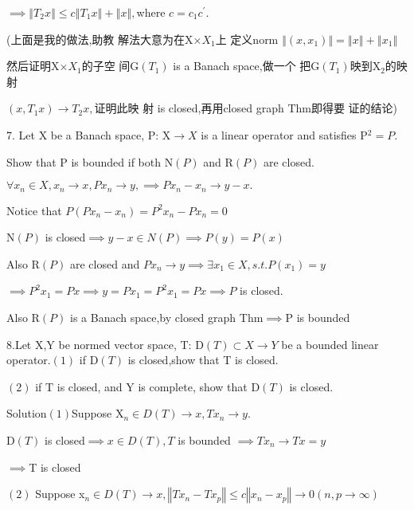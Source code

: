\documentclass{ctexart}
\begin{document}
$\implies \left\Vert T_{2}x\right\Vert \leq c\left\Vert T_{1}x\right\Vert
+\left\Vert x\right\Vert ,$where $c=c_{1}c^{\prime }.$

(上面是我的做法,助教%
解法大意为在X$\times X_{1}$上%
定义norm $\left\Vert \left( x,x_{1}\right) \right\Vert
=\left\Vert x\right\Vert +\left\Vert x_{1}\right\Vert $

然后证明X$\times X_{1}$的子空%
间G$\left( T_{1}\right) $ is a Banach space,做一个%
把G$\left( T_{1}\right) $映到X$_{2}$的映%
射

$\left( x,T_{1}x\right) \rightarrow T_{2}x,$证明此映%
射 is closed,再用closed graph Thm即得要%
证的结论)

7. Let X be a Banach space, P: X$\rightarrow X$ is a linear operator and
satisfies P$^{2}=P.$

Show that P is bounded if both N$\left( P\right) $ and R$\left( P\right) $
are closed.

$\forall x_{n}\in X,x_{n}\rightarrow x,Px_{n}\rightarrow y,\implies
Px_{n}-x_{n}\rightarrow y-x.$

Notice that $P\left( Px_{n}-x_{n}\right) =P^{2}x_{n}-Px_{n}=0$

N$\left( P\right) $ is closed$\implies y-x\in N\left( P\right) \implies
P\left( y\right) =P\left( x\right) $

Also R$\left( P\right) $ are closed and $Px_{n}\rightarrow y\implies \exists
x_{1}\in X,s.t.P\left( x_{1}\right) =y$

$\implies P^{2}x_{1}=Px\implies y=Px_{1}=P^{2}x_{1}=Px\implies P$ is closed.

Also R$\left( P\right) $ is a Banach space,by closed graph Thm$\implies $P
is bounded

8.Let X,Y be normed vector space, T: D$\left( T\right) \subset X\rightarrow
Y $ be a bounded linear operator.$\left( 1\right) $ if D$\left( T\right) $
is closed,show that T is closed.

$\left( 2\right) $ if T is closed, and Y is complete, show that D$\left(
T\right) $ is closed.

Solution$\left( 1\right) $Suppose X$_{n}\in D\left( T\right) \rightarrow
x,Tx_{n}\rightarrow y.$

D$\left( T\right) $ is closed$\implies x\in D\left( T\right) ,T$ is bounded $%
\implies Tx_{n}\rightarrow Tx=y$

$\implies $T is closed

$\left( 2\right) $ Suppose x$_{n}\in D\left( T\right) \rightarrow
x,\left\Vert Tx_{n}-Tx_{p}\right\Vert \leq c\left\Vert
x_{n}-x_{p}\right\Vert \rightarrow 0\left( n,p\rightarrow \infty \right) $
\end{document}
